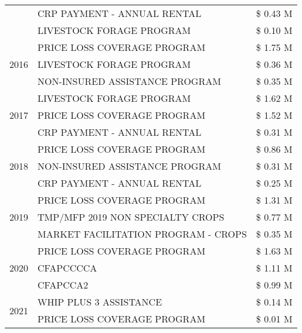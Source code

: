 \begin{tabular}{llr}
 & CRP PAYMENT - ANNUAL RENTAL & \$ 0.43 M \\
 & LIVESTOCK FORAGE PROGRAM & \$ 0.10 M \\
\cline{1-3}
\multirow[t]{3}{*}{2016} & PRICE LOSS COVERAGE PROGRAM                   & \$ 1.75 M \\
 & LIVESTOCK FORAGE PROGRAM                      & \$ 0.36 M \\
 & NON-INSURED ASSISTANCE PROGRAM                & \$ 0.35 M \\
\cline{1-3}
\multirow[t]{3}{*}{2017} & LIVESTOCK FORAGE PROGRAM & \$ 1.62 M \\
 & PRICE LOSS COVERAGE PROGRAM & \$ 1.52 M \\
 & CRP PAYMENT - ANNUAL RENTAL & \$ 0.31 M \\
\cline{1-3}
\multirow[t]{3}{*}{2018} & PRICE LOSS COVERAGE PROGRAM & \$ 0.86 M \\
 & NON-INSURED ASSISTANCE PROGRAM & \$ 0.31 M \\
 & CRP PAYMENT - ANNUAL RENTAL & \$ 0.25 M \\
\cline{1-3}
\multirow[t]{3}{*}{2019} & PRICE LOSS COVERAGE PROGRAM & \$ 1.31 M \\
 & TMP/MFP 2019 NON SPECIALTY CROPS & \$ 0.77 M \\
 & MARKET FACILITATION PROGRAM - CROPS & \$ 0.35 M \\
\cline{1-3}
\multirow[t]{3}{*}{2020} & PRICE LOSS COVERAGE PROGRAM & \$ 1.63 M \\
 & CFAPCCCCA & \$ 1.11 M \\
 & CFAPCCA2 & \$ 0.99 M \\
\cline{1-3}
\multirow[t]{2}{*}{2021} & WHIP PLUS 3 ASSISTANCE & \$ 0.14 M \\
 & PRICE LOSS COVERAGE PROGRAM & \$ 0.01 M \\
\cline{1-3}
\bottomrule
\end{tabular}
